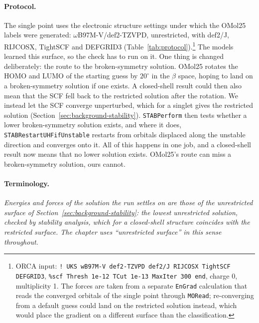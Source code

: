 \paragraph{Protocol.} The single point uses the electronic structure
settings under which the OMol25 labels were generated:
\mbox{$\omega$B97M-V/def2-TZVPD}, unrestricted, with def2/J, RIJCOSX,
TightSCF and DEFGRID3 (Table~\ref{tab:protocol}).\footnote{ORCA input:
\texttt{! UKS wB97M-V def2-TZVPD def2/J RIJCOSX TightSCF DEFGRID3},
\texttt{\%scf Thresh 1e-12 TCut 1e-13 MaxIter 300 end}, charge 0,
multiplicity 1. The forces are taken from a separate \texttt{EnGrad}
calculation that reads the converged orbitals of the single point
through \texttt{MORead}; re-converging from a default guess could land
on the restricted solution instead, which would place the gradient on a
different surface than the classification.} The models learned this
surface, so the check has to run on it. One thing is changed
deliberately: the route to the broken-symmetry solution. OMol25
rotates the HOMO and LUMO of the starting guess by $20^\circ$ in the
$\beta$ space, hoping to land on a broken-symmetry solution if one
exists. A closed-shell result could then also mean that the SCF fell
back to the restricted solution after the rotation. We instead let
the SCF converge unperturbed, which for a singlet gives the
restricted solution (Section~\ref{sec:background-stability}).
\texttt{STABPerform} then tests whether a lower broken-symmetry
solution exists, and where it does, \texttt{STABRestartUHFifUnstable}
restarts from orbitals displaced along the unstable direction and
converges onto it. All of this happens in one job, and a closed-shell
result now means that no lower solution exists. OMol25's route can
miss a broken-symmetry solution, ours cannot.

\paragraph{Terminology.} \emph{Energies and forces of the solution the
run settles on are those of the unrestricted surface of
Section~\ref{sec:background-stability}: the lowest unrestricted
solution, checked by stability analysis, which for a closed-shell
structure coincides with the restricted surface. The chapter uses
``unrestricted surface'' in this sense throughout.}


